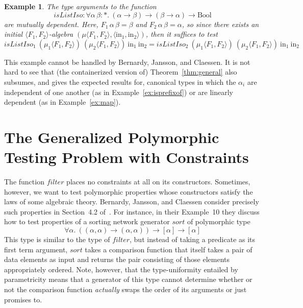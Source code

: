 \documentclass{article}[12 pt]
\newtheorem{example}{Example}
\theoremstyle{problemstyle}
\begin{document}
\begin{example}\label{ex:map-2}
The type arguments to the function
\begin{displaymath}
\mathit{isListIso} : \forall \alpha \, \beta : *.~(\alpha \to \beta) \to
(\beta \to \alpha) \to \mathrm{Bool}
\end{displaymath}
\noindent
are mutually dependent. Here, $F_1\,\alpha\,\beta = \beta$ and
$F_2\,\alpha\,\beta = \alpha$, so since there exists an initial
$\langle F_1, F_2 \rangle$-algebra $(\mu \langle F_1, F_2 \rangle,
\langle \mathrm{in}_1, \mathrm{in}_2 \rangle)$, then it suffices to
test
\[ \mathit{isListIso}_1~(\mu_1 \langle F_1,F_2
\rangle)~(\mu_2 \langle F_1,F_2 \rangle)~\mathrm{in}_1~\mathrm{in}_2 =
\mathit{isListIso}_2~(\mu_1 \langle F_1,F_2 \rangle)~(\mu_2 \langle
F_1,F_2 \rangle)~\mathrm{in}_1~\mathrm{in}_2\]

\end{example}
\noindent
This example cannot be handled by Bernardy, Jansson, and Claessen. It
is not hard to see that (the containerized version of)
Theorem~\ref{thm:general} also subsumes, and gives the expected
results for, canonical types in which the $\alpha_i$ are independent
of one another (as in Example~\ref{ex:isprefixof}) or are linearly
dependent (as in Example~\ref{ex:map}).  

\section{The Generalized Polymorphic Testing Problem with
  Constraints}\label{sec:constraints} 

The function $filter$ places no constraints at all on its
constructors. Sometimes, however, we want to test polymorphic
properties whose constructors satisfy the laws of some algebraic
theory. Bernardy, Jansson, and Claessen consider precisely such
properties in Section~4.2 of~\cite{bjc10}. For instance, in their
Example~10 they discuss how to test properties of a sorting network
generator $\mathit{sort}$ of polymorphic type
\[ \forall \alpha.~((\alpha, \alpha) \rightarrow (\alpha,
\alpha)) \rightarrow [\alpha] \rightarrow [\alpha] \]
\noindent
This type is similar to the type of $filter$, but instead of taking a
predicate as its first term argument, $\mathit{sort}$ takes a
comparison function that itself takes a pair of data elements as input
and returns the pair consisting of those elements appropriately
ordered. Note, however, that the type-uniformity entailed by
parametricity means that a generator of this type cannot determine
whether or not the comparison function {\em actually} swaps the order
of its arguments or just promises to.
\end{document}
